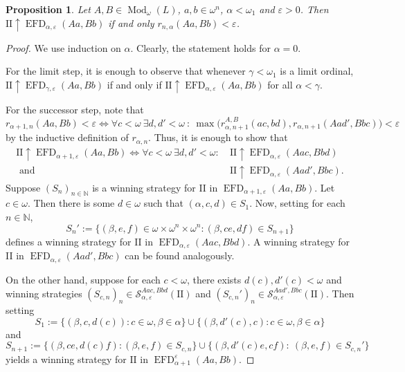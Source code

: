 \documentclass[12pt]{amsart}
\newtheorem{proposition}[theorem]{Proposition}
\DeclareMathOperator{\EFD}{EFD}
\DeclareMathOperator{\Mod}{Mod}
\begin{document}
\begin{proposition}\label{proposition: Games correspond to bnf pseudo-distance}
    Let $A,B\in\Mod_\omega(L)$, $a,b\in\omega^n$, $\alpha<\omega_1$ and $\varepsilon>0$. Then $\mathrm{II} \uparrow\EFD_{\alpha,\varepsilon}(Aa,Bb)$ if and only $r_{n,\alpha}(Aa,Bb)<\varepsilon$. 
\end{proposition}
\begin{proof}
    We use induction on $\alpha$.
    Clearly, the statement holds for $\alpha=0$. 

    For the limit step, it is enough to observe that whenever $\gamma<\omega_1$ is a limit ordinal, $\mathrm{II} \uparrow\EFD_{\gamma,\varepsilon}(Aa,Bb)$ if and only if $\mathrm{II} \uparrow\EFD_{\alpha,\varepsilon}(Aa,Bb)$ for all $\alpha<\gamma$.

    
    For the successor step, note that
    \[r_{\alpha+1,n}(Aa,Bb)<\varepsilon\iff\forall c<\omega \ \exists d,d'<\omega \ \colon \ \max\big(r_{\alpha,n+1}^{A,B}(ac,bd),r_{\alpha,n+1}(Aad',Bbc)\big)<\varepsilon\]
    by the inductive definition of $r_{\alpha,n}$.
    Thus, it is enough to show that 
    \begin{align*}\label{eq:Games}
        \textrm{II} \uparrow\EFD_{\alpha+1,\varepsilon}(Aa,Bb)\iff  \forall c<\omega \ \exists d,d'<\omega \colon~ & \textrm{II} \uparrow\EFD_{\alpha,\varepsilon}(Aac,Bbd)\\
        \text{ and }& \textrm{II} \uparrow\EFD_{\alpha,\varepsilon}(Aad',Bbc).
    \end{align*}
    Suppose $(S_n)_{n\in\mathbb N}$ is a winning strategy for II in $\EFD_{\alpha+1,\varepsilon}(Aa,Bb)$. Let $c\in \omega$. Then there is some $d\in\omega$ such that $(\alpha,c,d)\in S_1$. Now, setting for each $n\in\mathbb N$,
    \[S_n':=\{(\beta,e,f)\in\omega\times\omega^n\times\omega^n \colon (\beta,ce,df)\in S_{n+1}\}\]
    defines a winning strategy for II in $\EFD_{\alpha,\varepsilon}(Aac,Bbd)$. A winning strategy for II in $\EFD_{\alpha,\varepsilon}(Aad',Bbc)$ can be found analogously.

    On the other hand, suppose for each $c<\omega$, there exists $d(c),d'(c)<\omega$ and winning strategies $(S_{c,n})_n\in\mathcal{S}_{\alpha,\varepsilon}^{Aac,Bbd}(\mathrm{II})$ and $(S_{c,n}')_n\in \mathcal{S}_{\alpha,\varepsilon}^{Aad',Bbc}(\mathrm{II})$. 
    Then setting 
    \[S_1:=\{(\beta,c,d(c)) \colon c\in \omega,\beta\in\alpha\}\cup\{(\beta,d'(c),c) \colon c\in\omega,\beta\in\alpha\}\] and 
    \[S_{n+1}:=\{(\beta,ce,d(c)f) \colon (\beta,e,f)\in S_{c,n}\}\cup \{(\beta,d'(c)e,cf) \colon ~(\beta,e,f)\in S_{c,n}'\}\]
    yields a winning strategy for $\mathrm{II} $ in $\EFD_{\alpha+1}^\varepsilon(Aa,Bb)$.
\end{proof}
\end{document}
